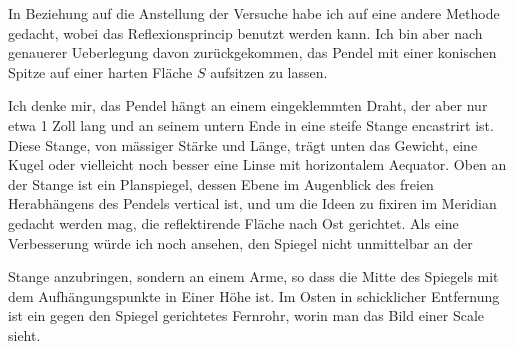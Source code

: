 In Beziehung auf die Anstellung der Versuche habe ich auf eine andere
Methode gedacht, wobei das Reflexionsprincip benutzt werden kann. Ich bin
aber nach genauerer Ueberlegung davon zurückgekommen, das Pendel mit
einer konischen Spitze auf einer harten Fläche \(S\) aufsitzen zu lassen.

\noindent\begin{minipage}[t]{.74\textwidth}\vspace{0pt}\setlength{\parindent}{1.2em}\hspace*{\parindent}Ich denke mir, das Pendel hängt an einem eingeklemmten
Draht, der aber nur etwa 1 Zoll lang und an
seinem untern Ende in eine steife Stange encastrirt ist.
Diese Stange, von mässiger Stärke und Länge, trägt unten
das Gewicht, eine Kugel oder vielleicht noch besser eine
Linse mit horizontalem Aequator. Oben an der Stange ist
ein Planspiegel, dessen Ebene im Augenblick des freien Herabhängens
des Pendels vertical ist, und um die Ideen zu
fixiren im Meridian gedacht werden mag, die reflektirende
Fläche nach Ost gerichtet. Als eine Verbesserung würde
ich noch ansehen, den Spiegel nicht unmittelbar an der
\end{minipage}\hfill\begin{minipage}[t]{.23\textwidth}\vspace{0pt}\centering
{}\end{minipage}
\par\noindent Stange anzubringen, sondern an einem Arme, so dass die Mitte des Spiegels
mit dem Aufhängungspunkte in Einer Höhe ist. Im Osten in schicklicher
Entfernung ist ein gegen den Spiegel gerichtetes Fernrohr, worin man das
Bild einer  Scale sieht.

